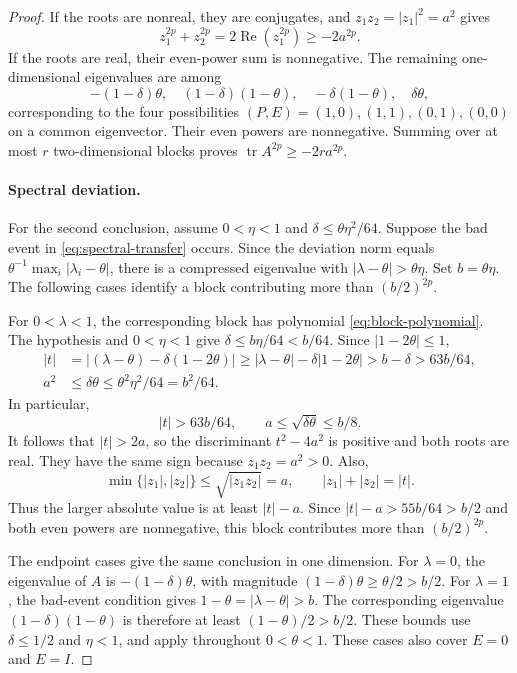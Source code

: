 \documentclass[11pt]{article}
\theoremstyle{definition}
\theoremstyle{remark}
\theoremstyle{plain}
\DeclareMathOperator{\tr}{tr}
\begin{document}
\begin{proof}
If the roots are nonreal, they
are conjugates, and \(z_1z_2=|z_1|^2=a^2\) gives
\[
 z_1^{2p}+z_2^{2p}
       =2\operatorname{Re}(z_1^{2p})\ge-2a^{2p}.
\]
If the roots are real, their even-power sum is nonnegative.
The remaining one-dimensional eigenvalues are among
\[
 -(1-\delta)\theta,\quad (1-\delta)(1-\theta),\quad
                  -\delta(1-\theta),\quad \delta\theta,
\]
corresponding to the four possibilities
\((P,E)=(1,0),(1,1),(0,1),(0,0)\) on a common eigenvector.
Their even powers are nonnegative. Summing over at most \(r\)
two-dimensional blocks proves \(\tr A^{2p}\ge-2ra^{2p}\).

\paragraph{Spectral deviation.}
For the second conclusion, assume \(0<\eta<1\) and
\(\delta\le\theta\eta^2/64\). Suppose the bad event in
\eqref{eq:spectral-transfer} occurs.
Since the deviation norm equals
$\theta^{-1}\max_i|\lambda_i-\theta|$, there is a compressed eigenvalue with
\(|\lambda-\theta|>\theta\eta\). Set \(b=\theta\eta\).
The following cases identify a block contributing more than \((b/2)^{2p}\).

For \(0<\lambda<1\), the corresponding block has polynomial
\eqref{eq:block-polynomial}. The hypothesis and \(0<\eta<1\) give
\(\delta\le b\eta/64<b/64\). Since \(|1-2\theta|\le1\),
\[
 \begin{split}
 |t|&=|(\lambda-\theta)-\delta(1-2\theta)|
       \ge|\lambda-\theta|-\delta|1-2\theta|
       >b-\delta>63b/64,\\
 a^2&\le\delta\theta\le\theta^2\eta^2/64=b^2/64.
 \end{split}
\]
In particular,
\[
 |t|>63b/64,\qquad a\le\sqrt{\delta\theta}\le b/8.
\]
It follows that \(|t|>2a\), so the discriminant \(t^2-4a^2\)
is positive and both roots are real. They have the same sign
because \(z_1z_2=a^2>0\). Also,
\[
 \min\{|z_1|,|z_2|\}\le\sqrt{|z_1z_2|}=a,\qquad
 |z_1|+|z_2|=|t|.
\]
Thus the larger absolute value is at least \(|t|-a\).
Since \(|t|-a>55b/64>b/2\) and both even powers are nonnegative, this
block contributes more than \((b/2)^{2p}\).

The endpoint cases give the same conclusion in one dimension.
For \(\lambda=0\), the eigenvalue of \(A\) is
\(-(1-\delta)\theta\), with magnitude
\((1-\delta)\theta\ge\theta/2>b/2\).
For \(\lambda=1\), the bad-event condition gives
\(1-\theta=|\lambda-\theta|>b\). The corresponding eigenvalue
\((1-\delta)(1-\theta)\) is therefore at least
\((1-\theta)/2>b/2\). These bounds use
\(\delta\le1/2\) and \(\eta<1\), and apply throughout \(0<\theta<1\).
These cases also cover \(E=0\) and \(E=I\).


\end{proof}
\end{document}
